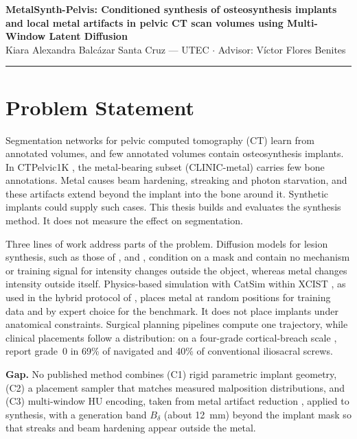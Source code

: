 \documentclass[9pt]{extarticle}
\begin{document}
\begin{center}
  {\Large\bfseries MetalSynth-Pelvis: Conditioned synthesis of osteosynthesis implants\\[2pt]
  and local metal artifacts in pelvic CT scan volumes using Multi-Window Latent Diffusion}\\[3pt]
  {\normalsize Kiara Alexandra Balc\'azar Santa Cruz --- UTEC \quad $\cdot$ \quad Advisor: V\'ictor Flores Benites}
\end{center}
\vspace{1pt}\hrule\vspace{4pt}

\section{Problem Statement}

Segmentation networks for pelvic computed tomography (CT) learn from annotated volumes, and few annotated volumes contain osteosynthesis implants. In CTPelvic1K \citep{liu2021ctpelvic1k}, the metal-bearing subset (CLINIC-metal) carries few bone annotations. Metal causes beam hardening, streaking and photon starvation, and these artifacts extend beyond the implant into the bone around it. Synthetic implants could supply such cases. This thesis builds and evaluates the synthesis method. It does not measure the effect on segmentation.

Three lines of work address parts of the problem. Diffusion models for lesion synthesis, such as those of \citet{chen2024tumorsynthesis}, \citet{zhang2025diffboost} and \citet{ramzan2026claim}, condition on a mask and contain no mechanism or training signal for intensity changes outside the object, whereas metal changes intensity outside itself. Physics-based simulation with CatSim \citep{deman2007catsim} within XCIST \citep{wu2022xcist}, as used in the hybrid protocol of \citet{peters2025hybrid}, places metal at random positions for training data and by expert choice for the benchmark. It does not place implants under anatomical constraints. Surgical planning pipelines \citep{liu2025pipeline} compute one trajectory, while clinical placements follow a distribution: on a four-grade cortical-breach scale \citep{smith2006iliosacral}, \citet{zwingmann2009navigated} report grade~0 in 69\% of navigated and 40\% of conventional iliosacral screws.

\textbf{Gap.} No published method combines (C1) rigid parametric implant geometry, (C2) a placement sampler that matches measured malposition distributions, and (C3) multi-window HU encoding, taken from metal artifact reduction \citep{wang2025adaptiveweighting}, applied to synthesis, with a generation band $B_{\delta}$ (about 12~mm) beyond the implant mask so that streaks and beam hardening appear outside the metal.
\end{document}
